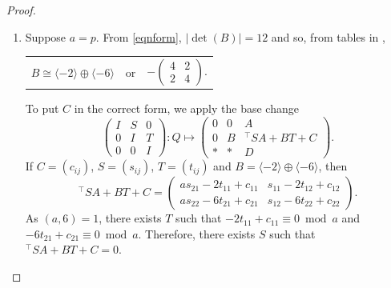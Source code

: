 \documentclass[11pt]{article}
\newcommand{\ZZ}{\mathbb{Z}}
\newcommand{\la}{\langle}
\newcommand{\ra}{\rangle}
\newcommand{\opn}{\operatorname}
\newcommand{\op}{\oplus}
\newcommand{\beq}{\begin{equation*}}
\newcommand{\eeq}{\end{equation*}}
\newcommand{\bpm}{\begin{pmatrix}}
\newcommand{\epm}{\end{pmatrix}}
\begin{document}
\begin{proof}
\begin{enumerate}
      To put $D$ in the required form, we apply 
      \begin{equation}\label{Dtrans}
        \bpm
        I & 0 & W \\
        0 & I & 0 \\
        0 & 0 & I
        \epm:
        Q \mapsto
        \bpm
        0 & 0 & A \\
        0 & B & C \\
        * & * &  {^{\intercal}}WA +{^{\intercal}}AW  + D
        \epm,
      \end{equation}
      and the result follows by noting that $L$ is even and
      \beq
      \left \{ {}^{\intercal}WA +{^{\intercal}}AW \mid W \in M_2(\ZZ) \right \}
      =
      \left \{
      \bpm
      2ax & y \\
      y & 2z
      \epm
      \mid
      x,y,z \in \ZZ
      \right \}.
      \eeq
    \item Suppose $a=p$.
      From \eqref{eqnform}, $\vert \opn{det}(B) \vert =12$ and so, from tables in \cite{SPLAG},
      \begin{center}
        \begin{tabular}{c c c}
          $B \cong \la -2 \ra \op \la -6 \ra$
          & or &
          $-\bpm 4 & 2 \\ 2 & 4 \epm$.
        \end{tabular}
      \end{center}
      To put $C$ in the correct form, we apply the base change
      \begin{equation}\label{Ctrans}
        \bpm
        I & S & 0 \\
        0 & I & T \\
        0 & 0 & I
        \epm:
        Q \mapsto
        \bpm
        0 & 0 & A \\
        0 & B & {}^{\intercal}SA + BT + C \\
        * & * & D
        \epm.
      \end{equation}
      If $C = (c_{ij})$,
      $S = (s_{ij})$,
      $T = (t_{ij})$ and 
      $B = \la -2 \ra \op \la - 6 \ra$,
      then
      \beq
          {}^{\intercal}SA + BT + C =
          \bpm
          as_{21} - 2 t_{11} + c_{11} &
          s_{11} - 2t_{12} + c_{12} \\
          a s_{22} - 6 t_{21} + c_{21} &
          s_{12} - 6t_{22} + c_{22}
          \epm.
          \eeq
          As $(a, 6)=1$, there exists $T$ such that
          $-2t_{11} + c_{11} \equiv 0 \bmod{ a}$ and
          $-6t_{21} + c_{21} \equiv 0 \bmod{ a}$.
          Therefore, there exists $S$ such that $ {}^{\intercal}SA + BT + C =0$.


\end{enumerate}
\end{proof}
\end{document}
